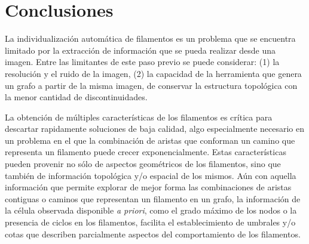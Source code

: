\chapter{Conclusiones}
\label{chap:conclu}
La individualizaci\'on autom\'atica de filamentos es un problema que se encuentra limitado por la extracci\'on de informaci\'on que se pueda realizar desde una imagen. Entre las limitantes de este paso previo se puede considerar: (1) la resoluci\'on y el ruido de la imagen, (2) la capacidad de la herramienta que genera un grafo a partir de la misma imagen, de conservar la estructura topol\'ogica con la menor cantidad de discontinuidades.%



La obtenci\'on de m\'ultiples caracter\'isticas de los filamentos es cr\'itica para descartar rapidamente soluciones de baja calidad, algo especialmente necesario en un problema en el que la combinaci\'on de aristas que conforman un camino que representa un filamento puede crecer exponencialmente. Estas caracter\'isticas pueden provenir no s\'olo de aspectos geom\'etricos de los filamentos, sino que tambi\'en de informaci\'on topol\'ogica y/o espacial de los mismos.
A\'un con aquella informaci\'on que permite explorar de mejor forma las combinaciones de aristas contiguas o caminos que representan un filamento en un grafo, la informaci\'on de la c\'elula observada disponible {\it a priori}, como el grado m\'aximo de los nodos o la presencia de ciclos en los filamentos, facilita el establecimiento de umbrales y/o cotas que describen parcialmente aspectos del comportamiento de los filamentos.


